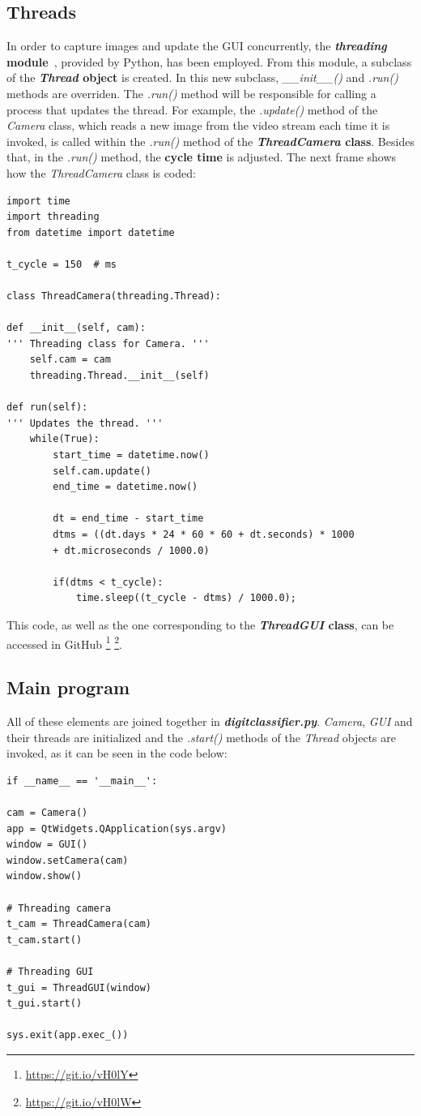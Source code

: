 \subsection{Threads} 
In order to capture images and update the GUI concurrently, the \textbf{\textit{threading} module}~\cite{threading}, provided by Python, has been employed. From this module, a subclass of the \textbf{\textit{Thread} object} is created. In this new subclass, \textit{\_\_init\_\_()} and \textit{.run()} methods are overriden. The \textit{.run()} method will be responsible for calling a process that updates the thread. For example, the \textit{.update()} method of the \textit{Camera} class, which reads a new image from the video stream each time it is invoked, is called within the \textit{.run()} method of the \textbf{\textit{ThreadCamera} class}. Besides that, in the \textit{.run()} method, the \textbf{cycle time} is adjusted. The next frame shows how the \textit{ThreadCamera} class is coded:
\begin{lstlisting}
import time
import threading
from datetime import datetime

t_cycle = 150  # ms

class ThreadCamera(threading.Thread):

def __init__(self, cam):
''' Threading class for Camera. '''
	self.cam = cam
	threading.Thread.__init__(self)

def run(self):
''' Updates the thread. '''
	while(True):
		start_time = datetime.now()
		self.cam.update()
		end_time = datetime.now()
		
		dt = end_time - start_time
		dtms = ((dt.days * 24 * 60 * 60 + dt.seconds) * 1000
		+ dt.microseconds / 1000.0)
		
		if(dtms < t_cycle):
			time.sleep((t_cycle - dtms) / 1000.0);
\end{lstlisting}
This code, as well as the one corresponding to the \textbf{\textit{ThreadGUI} class}, can be accessed in GitHub \footnote{\url{https://git.io/vH0lY}} \footnote{\url{https://git.io/vH0lW}}.

\subsection{Main program}
All of these elements are joined together in \textbf{\textit{digitclassifier.py}}. \textit{Camera}, \textit{GUI} and their threads are initialized and the \textit{.start()} methods of the \textit{Thread} objects are invoked, as it can be seen in the code below:
\begin{lstlisting}
if __name__ == '__main__':

cam = Camera()
app = QtWidgets.QApplication(sys.argv)
window = GUI()
window.setCamera(cam)
window.show()

# Threading camera
t_cam = ThreadCamera(cam)
t_cam.start()

# Threading GUI
t_gui = ThreadGUI(window)
t_gui.start()

sys.exit(app.exec_())
\end{lstlisting}

